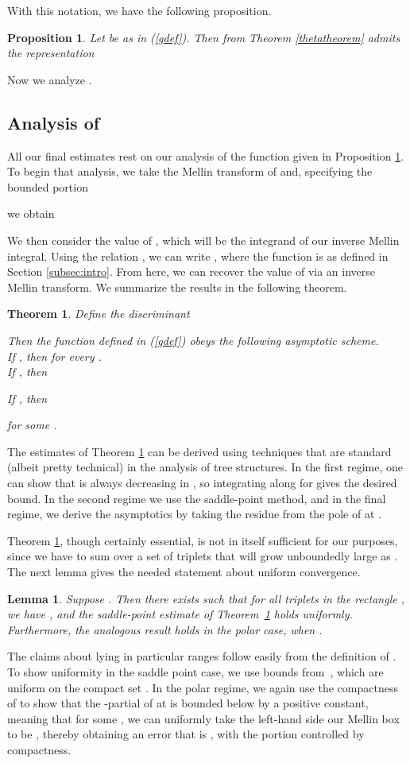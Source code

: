 \documentclass[proceedings]{aofa}
\newtheorem{theorem}{Theorem}
\newtheorem{lemma}{Lemma}
\newtheorem{proposition}{Proposition}
\begin{document}
With this notation, we have the following proposition.
\begin{proposition}\label{gprop}
Let  be as in (\ref{gdef}). Then  from Theorem \ref{thetatheorem} admits the representation 
\end{proposition}
Now we analyze .
\subsection{Analysis of }
All our final estimates rest on our analysis of the function  given in Proposition \ref{gprop}. To begin that analysis, we take the Mellin transform of  and, specifying the bounded portion

we obtain


We then consider the value of , which will be the integrand of our inverse Mellin integral. Using the relation , we can write
,
where the function  is as defined in Section \ref{subsec:intro}.
From here, we can recover the value of  via an inverse Mellin transform. We summarize the results in the following theorem.
\begin{theorem}\label{hasymptote}
Define the discriminant

Then the function  defined in (\ref{gdef}) obeys the following asymptotic scheme. \\
If , then  for every .\\
If , then

If , then 

for some .
\end{theorem}
The estimates of Theorem \ref{hasymptote} can be derived using techniques that are standard (albeit pretty technical) in the analysis of tree structures. In the first regime, one can show that  is always decreasing in , so integrating along  for  gives the desired bound. In the second regime we use the saddle-point method, and in the final regime, we derive the asymptotics by taking the residue from the pole of  at . 


Theorem \ref{hasymptote}, though certainly essential, is not in itself sufficient for our purposes, since we have to sum  over a set of triplets  that will grow unboundedly large as . The next lemma gives the needed statement about uniform convergence.
\begin{lemma}\label{uniformlemma}
Suppose . Then there exists  such that for all triplets  in the rectangle , we have , and the saddle-point estimate of Theorem~\ref{hasymptote} holds uniformly. Furthermore, the analogous result holds in the polar case, when .
\end{lemma}
The claims about  lying in particular ranges follow easily from the definition of . To show uniformity in the saddle point case, we use bounds from~\cite{Olver}, which are uniform on the compact set . In the polar regime, we again use the compactness of  to show that the -partial of  at  is bounded below by a positive constant, meaning that for some , we can uniformly take the left-hand side our Mellin box to be , thereby obtaining an error that is , with the  portion controlled by compactness.
\end{document}
